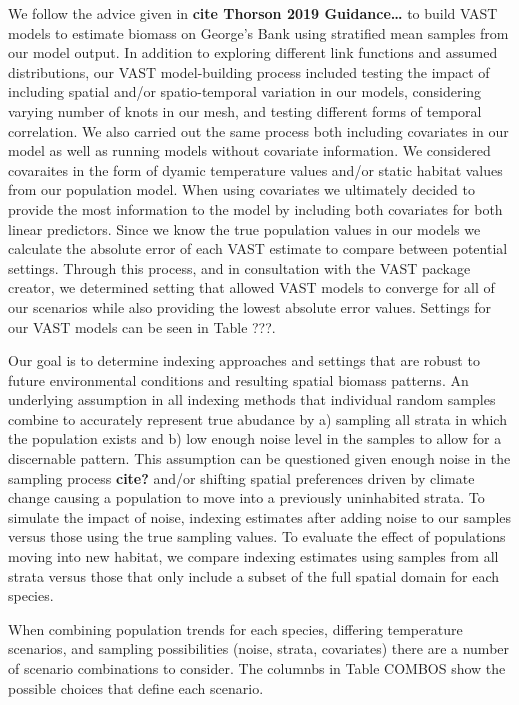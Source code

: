 \documentclass[
]{article}
\begin{document}
We follow the advice given in \textbf{cite Thorson 2019 Guidance\ldots{}} to build VAST models to estimate biomass on George's Bank using stratified mean samples from our model output. In addition to exploring different link functions and assumed distributions, our VAST model-building process included testing the impact of including spatial and/or spatio-temporal variation in our models, considering varying number of knots in our mesh, and testing different forms of temporal correlation. We also carried out the same process both including covariates in our model as well as running models without covariate information. We considered covaraites in the form of dyamic temperature values and/or static habitat values from our population model. When using covariates we ultimately decided to provide the most information to the model by including both covariates for both linear predictors. Since we know the true population values in our models we calculate the absolute error of each VAST estimate to compare between potential settings. Through this process, and in consultation with the VAST package creator, we determined setting that allowed VAST models to converge for all of our scenarios while also providing the lowest absolute error values. Settings for our VAST models can be seen in Table ???.

Our goal is to determine indexing approaches and settings that are robust to future environmental conditions and resulting spatial biomass patterns. An underlying assumption in all indexing methods that individual random samples combine to accurately represent true abudance by a) sampling all strata in which the population exists and b) low enough noise level in the samples to allow for a discernable pattern. This assumption can be questioned given enough noise in the sampling process \textbf{cite?} and/or shifting spatial preferences driven by climate change causing a population to move into a previously uninhabited strata. To simulate the impact of noise, indexing estimates after adding noise to our samples versus those using the true sampling values. To evaluate the effect of populations moving into new habitat, we compare indexing estimates using samples from all strata versus those that only include a subset of the full spatial domain for each species.

When combining population trends for each species, differing temperature scenarios, and sampling possibilities (noise, strata, covariates) there are a number of scenario combinations to consider. The columnbs in Table COMBOS show the possible choices that define each scenario.
\end{document}
